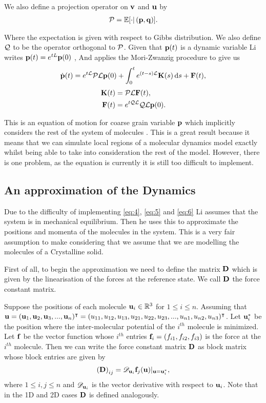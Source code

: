We also define a projection operator on $\mathbf{v}$ and $\mathbf{u}$ by
\begin{align*}
\mathbf{\mathcal{P}} = \mathbb{E}{\left[ \cdot \vert \left (\mathbf{p}, \mathbf{q} \right )\right ] }.
\end{align*}

Where the expectation is given with respect to Gibbs distribution. We also define $\mathbf{\mathcal{Q}}$ to be the operator orthogonal to $\mathbf{\mathcal{P}}$. Given that $\mathbf{p}(t)$ is a dynamic variable Li writes $\mathbf{p}(t) = e^{tL}\mathbf{p}(0)$ \cite{Li2010}, And applies the Mori-Zwanzig procedure to give us
\begin{align}
\dot{\mathbf{p}}(t) = e^{t\mathbf{\mathcal{L}}}\mathbf{\mathcal{P}}\mathbf{\mathcal{L}}\mathbf{p}(0) + \int_{0}^{t} e^{(t-s)\mathbf{\mathcal{L}}}\mathbf{K}(s) \mathop{}\!\mathrm{d} s + \mathbf{F}(t),\label{eq:4}
\end{align}
\begin{align}
\mathbf{K}(t) & = \mathbf{\mathcal{P}} \mathbf{\mathcal{L}} \mathbf{F}(t), \label{eq:5}
\\ \mathbf{F}(t) &= e^{t\mathbf{\mathcal{Q}}\mathbf{\mathcal{L}}}\mathbf{\mathcal{Q}}\mathbf{\mathcal{L}}\mathbf{p}(0).\label{eq:6}
\end{align}

This is an equation of motion for coarse grain variable $\mathbf{p}$ which implicitly considers the rest of the system of molecules \cite{Li2010}  \cite{Hald2006}. This is a great result because it means that we can simulate local regions of a molecular dynamics model exactly whilst being able to take into consideration the rest of the model. However, there is one problem, as the equation is currently it is still too difficult to implement.

\subsection{An approximation of the Dynamics}

Due to the difficulty of implementing \eqref{eq:4}, \eqref{eq:5} and \eqref{eq:6} Li assumes that the system is in mechanical equilibrium. Then he uses this to approximate the positions and momenta of the molecules in the system. This is a very fair assumption to make considering that we assume that we are modelling the molecules of a Crystalline solid. 

 First of all, to begin the approximation we need to define the matrix $\mathbf{D}$ which is given by the linearisation of the forces at the reference state. We call $\mathbf{D}$ the force constant matrix.

Suppose the positions of each molecule $\mathbf{u}_i \in \mathbb{R}^3$ for $1\leq i \leq n$. Assuming that $\mathbf{u} = (\mathbf{u}_1,\mathbf{u}_2,\mathbf{u}_3,...,\mathbf{u}_n)^{\intercal}= (u_{11}, u_{12}, u_{13}, u_{21}, u_{22}, u_{23},..., u_{n1}, u_{n2}, u_{n3})^\intercal$. Let $\mathbf{u}_{i}^*$ be the position where the inter-molecular potential of the $i^{th}$ molecule is minimized. Let $\mathbf{f}$ be the vector function whose $i^{th}$ entries $\mathbf{f}_i=\left(f_{i1},f_{i2}, f_{i3}\right)$ is the force at the $i^{th}$ molecule. Then we can write the force constant matrix $\mathbf{D}$ as block matrix whose block entries are given by 
\begin{align*}
\left(\mathbf{D}\right)_{ij} = \mathscr{D}_{\mathbf{u}_i}\mathbf{f}_j(\mathbf{u})\vert_{\mathbf{u}=\mathbf{u}_{i}^*},
\end{align*}
 where  $ 1\leq i,j\leq n$ and $\mathscr{D}_{\mathbf{u}_i}$ is the vector derivative with respect to $\mathbf{u}_i$. Note that in the 1D and 2D cases $\mathbf{D}$ is defined analogously.
 
